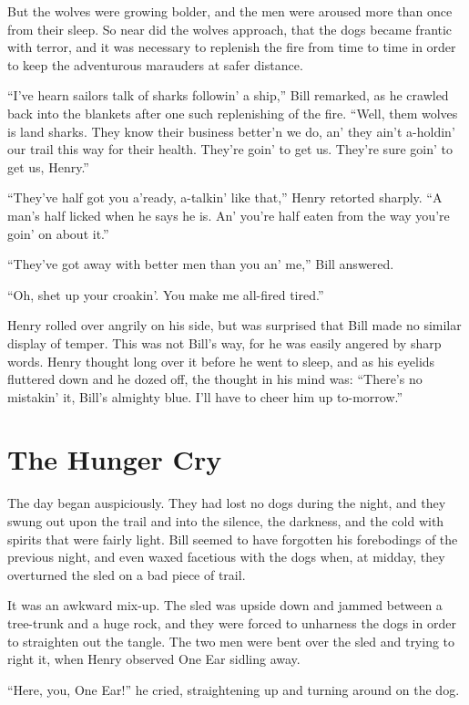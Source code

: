 \documentclass[10pt]{book}
\begin{document}
But the wolves were growing bolder, and the men were aroused more than
once from their sleep. So near did the wolves approach, that the dogs
became frantic with terror, and it was necessary to replenish the fire
from time to time in order to keep the adventurous marauders at safer
distance.

“I’ve hearn sailors talk of sharks followin’ a ship,” Bill remarked, as
he crawled back into the blankets after one such replenishing of the
fire. “Well, them wolves is land sharks. They know their business
better’n we do, an’ they ain’t a-holdin’ our trail this way for their
health. They’re goin’ to get us. They’re sure goin’ to get us, Henry.”

“They’ve half got you a’ready, a-talkin’ like that,” Henry retorted
sharply. “A man’s half licked when he says he is. An’ you’re half eaten
from the way you’re goin’ on about it.”

“They’ve got away with better men than you an’ me,” Bill answered.

“Oh, shet up your croakin’. You make me all-fired tired.”

Henry rolled over angrily on his side, but was surprised that Bill made
no similar display of temper. This was not Bill’s way, for he was
easily angered by sharp words. Henry thought long over it before he
went to sleep, and as his eyelids fluttered down and he dozed off, the
thought in his mind was: “There’s no mistakin’ it, Bill’s almighty
blue. I’ll have to cheer him up to-morrow.”

\chapter{The Hunger Cry}

The day began auspiciously. They had lost no dogs during the night, and
they swung out upon the trail and into the silence, the darkness, and
the cold with spirits that were fairly light. Bill seemed to have
forgotten his forebodings of the previous night, and even waxed
facetious with the dogs when, at midday, they overturned the sled on a
bad piece of trail.

It was an awkward mix-up. The sled was upside down and jammed between a
tree-trunk and a huge rock, and they were forced to unharness the dogs
in order to straighten out the tangle. The two men were bent over the
sled and trying to right it, when Henry observed One Ear sidling away.

“Here, you, One Ear!” he cried, straightening up and turning around on
the dog.
\end{document}
